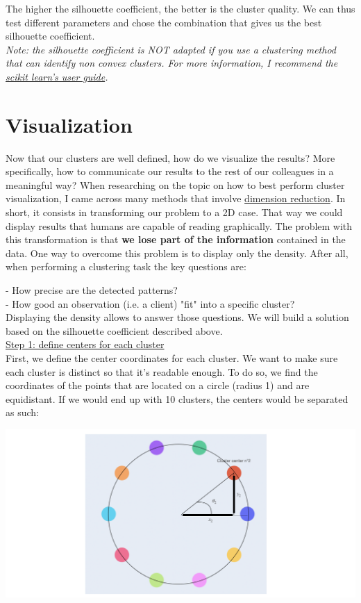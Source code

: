 The higher the silhouette coefficient, the better is the cluster quality. We can thus test different parameters and chose the combination that gives us the best silhouette coefficient. \\

\textit{Note: the silhouette coefficient is NOT adapted if you use a clustering method that can identify non convex clusters. For more information, I recommend the \href{https://scikit-learn.org/stable/modules/clustering.html}{scikit learn's user guide}.}


\section{Visualization}

Now that our clusters are well defined, how do we visualize the results? More specifically, how to communicate our results to the rest of our colleagues in a meaningful way?
When researching on the topic on how to best perform cluster visualization, I came across many methods that involve \href{https://en.wikipedia.org/wiki/Dimensionality_reduction}{dimension reduction}. In short, it consists in transforming our problem to a 2D case. That way we could display results that humans are capable of reading graphically. The problem with this transformation is that \textbf{we lose part of the information} contained in the data.
One way to overcome this problem is to display only the density. After all, when performing a clustering task the key questions are:

- How precise are the detected patterns? \\
- How good an observation (i.e. a client) "fit" into a specific cluster? \\

Displaying the density allows to answer those questions. We will build a solution based on the silhouette coefficient described above. \\

\underline{Step 1: define centers for each cluster} \\

First, we define the center coordinates for each cluster. We want to make sure each cluster is distinct so that it's readable enough. To do so, we find the coordinates of the points that are located on a circle (radius 1) and are equidistant. If we would end up with 10 clusters, the centers would be separated as such:

\begin{center}
\includegraphics[scale=0.5]{./../img/10-clusters-angle-3}
\end{center}

